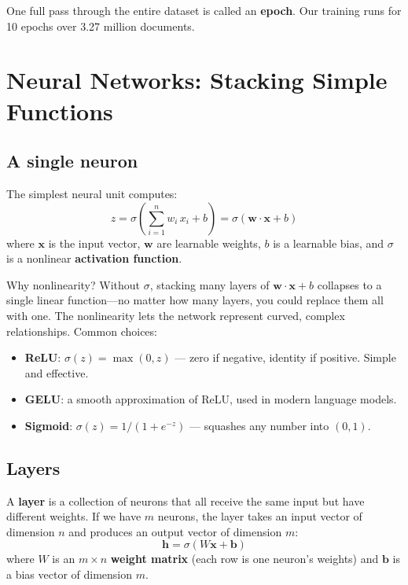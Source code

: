 \documentclass[11pt,a4paper]{article}
\theoremstyle{definition}
\begin{document}
One full pass through the entire dataset is called an \textbf{epoch}.
Our training runs for 10 epochs over 3.27 million documents.

\section{Neural Networks: Stacking Simple Functions}
\label{sec:nn}

\subsection{A single neuron}

The simplest neural unit computes:
\[
z = \sigma\!\left(\sum_{i=1}^n w_i \, x_i + b\right)
= \sigma(\mathbf{w} \cdot \mathbf{x} + b)
\]
where $\mathbf{x}$ is the input vector, $\mathbf{w}$ are learnable
weights, $b$ is a learnable bias, and $\sigma$ is a nonlinear
\textbf{activation function}.

\begin{intuition}{Why nonlinearity?}
Without $\sigma$, stacking many layers of $\mathbf{w} \cdot \mathbf{x} + b$
collapses to a single linear function---no matter how many layers, you
could replace them all with one. The nonlinearity lets the network
represent curved, complex relationships. Common choices:
\begin{itemize}[nosep]
  \item \textbf{ReLU}: $\sigma(z) = \max(0, z)$ --- zero if negative,
        identity if positive. Simple and effective.
  \item \textbf{GELU}: a smooth approximation of ReLU, used in modern
        language models.
  \item \textbf{Sigmoid}: $\sigma(z) = 1/(1+e^{-z})$ --- squashes any
        number into $(0, 1)$.
\end{itemize}
\end{intuition}

\subsection{Layers}

A \textbf{layer} is a collection of neurons that all receive the same
input but have different weights. If we have $m$ neurons, the layer
takes an input vector of dimension $n$ and produces an output vector of
dimension $m$:
\[
\mathbf{h} = \sigma(W\mathbf{x} + \mathbf{b})
\]
where $W$ is an $m \times n$ \textbf{weight matrix} (each row is one
neuron's weights) and $\mathbf{b}$ is a bias vector of dimension $m$.
\end{document}
